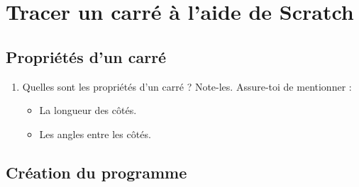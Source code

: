 \def\assignmentNameWidth{6cm}
\def\imgPath{enseignement/6e/geometrie-plane/polygones/}




\section{Tracer un carré à l'aide de Scratch} 

\subsection{Propriétés d'un carré} 

\begin{enumerate} 
    \item Quelles sont les propriétés d'un carré ? Note-les. Assure-toi de mentionner : 
    \begin{itemize} 
        \item La longueur des côtés. 
        \item Les angles entre les côtés. 
    \end{itemize} 
\end{enumerate} 

\subsection{Création du programme} 

